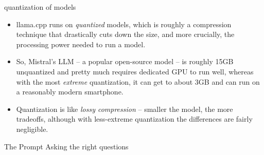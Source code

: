 \documentclass{beamer}
\begin{document}
\begin{frame}{quantization of models}
	\begin{itemize}
		\item llama.cpp runs on \textit{quantized} models, which is roughly a compression technique that drastically cuts down the size, and more crucially, the processing power needed to run a model.
		\pause
		\item So, Mistral's LLM -- a popular open-source model -- is roughly 15GB unquantized and pretty much requires dedicated GPU to run well, whereas with the most \textit{extreme} quantization, it can get to about 3GB and can run on a reasonably modern smartphone.
		\pause
		\item Quantization is like \textit{lossy compression} -- smaller the model, the more tradeoffs, although with less-extreme quantization the differences are fairly negligible.
	\end{itemize}
	
\end{frame}

\begin{frame}{The Prompt}
			Asking the right questions
\end{frame}

\begin{frame}[plain]
\end{frame}

\begin{frame}[plain]
\end{frame}
\end{document}

